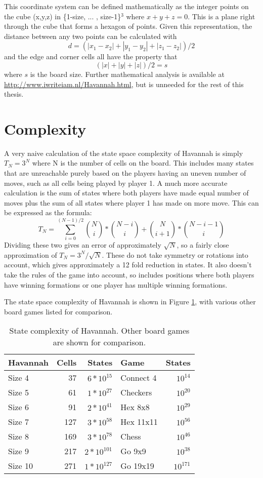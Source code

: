 This coordinate system can be defined mathematically as the integer points on the cube (x,y,z) in \{1-size, ... , size-1\}$^3$ where $x + y + z = 0$. This is a plane right through the cube that forms a hexagon of points. Given this representation, the distance between any two points can be calculated with
$$d = (|x_1-x_2| + |y_1-y_2| + |z_1-z_2|)/2$$
and the edge and corner cells all have the property that
$$(|x| + |y| + |z|)/2 = s$$
where $s$ is the board size. Further mathematical analysis is available at \url{http://www.iwriteiam.nl/Havannah.html}, but is unneeded for the rest of this thesis.



\section{Complexity}

A very naive calculation of the state space complexity of Havannah is simply $T_N = 3^N$ where N is the number of cells on the board. This includes many states that are unreachable purely based on the players having an uneven number of moves, such as all cells being played by player 1. A much more accurate calculation is the sum of states where both players have made equal number of moves plus the sum of all states where player 1 has  made on more move. This can be expressed as the formula:
$$T_N = \sum_{i = 0}^{(N-1)/2} {N \choose i}*{N-i \choose i} + {N \choose i + 1}*{N - i - 1 \choose i}$$
Dividing these two gives an error of approximately $\sqrt{N}$, so a fairly close approximation of $T_N = 3^N/\sqrt{N}$. These do not take symmetry or rotations into account, which gives approximately a 12 fold reduction in states. It also doesn't take the rules of the game into account, so includes positions where both players have winning formations or one player has multiple winning formations.

The state space complexity of Havannah is shown in Figure \ref{table:complexity}, with various other board games listed for comparison.

\begin{table}
  \centering
\begin{tabular}{lrr|lr}
Havannah & Cells & States       & Game      & States \\ \hline
Size 4   &    37 & $6*10^{15}$  & Connect 4 & $10^{14}$ \\
Size 5   &    61 & $1*10^{27}$  & Checkers  & $10^{20}$ \\
Size 6   &    91 & $2*10^{41}$  & Hex 8x8   & $10^{29}$ \\
Size 7   &   127 & $3*10^{58}$  & Hex 11x11 & $10^{56}$ \\
Size 8   &   169 & $3*10^{78}$  & Chess     & $10^{46}$ \\
Size 9   &   217 & $2*10^{101}$ & Go 9x9    & $10^{38}$ \\
Size 10  &   271 & $1*10^{127}$ & Go 19x19  & $10^{171}$\\

\end{tabular}
	\caption{State complexity of Havannah. Other board games are shown for comparison.}
	\label{table:complexity}
\end{table}

